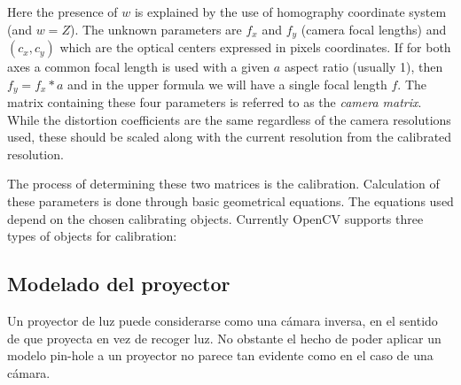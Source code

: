 

Here the presence of $w$ is explained by the use of homography coordinate system (and $w=Z$). The unknown parameters are $f_x$ and $f_y$ (camera focal lengths) and $(c_x, c_y)$ which are the optical centers expressed in pixels coordinates. If for both axes a common focal length is used with a given $a$ aspect ratio (usually 1), then $f_y=f_x*a$ and in the upper formula we will have a single focal length $f$. The matrix containing these four parameters is referred to as the \emph{camera matrix}. While the distortion coefficients are the same regardless of the camera resolutions used, these should be scaled along with the current resolution from the calibrated resolution.

The process of determining these two matrices is the calibration. Calculation of these parameters is done through basic geometrical equations. The equations used depend on the chosen calibrating objects. Currently OpenCV supports three types of objects for calibration:


































\subsection{Modelado del proyector}
Un proyector de luz puede considerarse como una cámara inversa, en el sentido de que proyecta en vez de recoger luz. No obstante el hecho de poder aplicar un modelo pin-hole a un proyector no parece tan evidente como en el caso de una cámara. 

